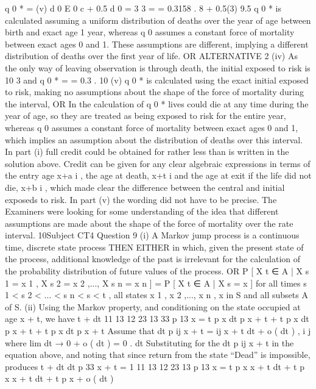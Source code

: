 \documentclass[a4paper,12pt]{article}
\begin{document}
\begin{enumerate}
q 0 * =
(v)
d 0
E 0 c
+ 0.5 d 0
=
3
3
=
= 0.3158 .
8 + 0.5(3) 9.5
q 0 * is calculated assuming a uniform distribution of deaths over the year of age
between birth and exact age 1 year, whereas q 0 assumes a constant force of mortality
between exact ages 0 and 1.
These assumptions are different, implying a different distribution of deaths over the
first year of life.
OR ALTERNATIVE 2
(iv) As the only way of leaving observation is through death, the initial exposed to risk is 10
3
and q 0 * =
= 0.3 .
10
(v) q 0 * is calculated using the exact initial exposed to risk, making no assumptions about
the shape of the force of mortality during the interval,
OR
In the calculation of q 0 * lives could die at any time during the year of age, so they are
treated as being exposed to risk for the entire year, whereas q 0 assumes a constant force
of mortality between exact ages 0 and 1, which implies an assumption about the
distribution of deaths over this interval.
In part (i) full credit could be obtained for rather less than is written in the solution above.
Credit can be given for any clear algebraic expressions in terms of the entry age x+a i , the
age at death, x+t i and the age at exit if the life did not die, x+b i , which made clear the
difference between the central and initial exposeds to risk.
In part (v) the wording did not have to be precise. The Examiners were looking for some
understanding of the idea that different assumptions are made about the shape of the force of
mortality over the rate interval.
10Subject CT4 %
Question 9
(i)
A Markov jump process is a continuous time, discrete state process
THEN EITHER
in which, given the present state of the process, additional knowledge of the past is
irrelevant for the calculation of the probability distribution of future values of the
process.
OR
P [ X t ∈ A | X s 1 = x 1 , X s 2 = x 2 ,..., X s n = x n ] = P [ X t ∈ A | X s = x ]
for all times s 1 < s 2 < ... < s n < s < t , all states x 1 , x 2 ,..., x n , x in S and all subsets A of S.
(ii)
Using the Markov property, and conditioning on the state occupied
at age x + t, we have
t + dt
11
13
12
23
13
33
p 13
x = t p x dt p x + t + t p x dt p x + t + t p x dt p x + t
Assume that
dt
p ij x + t = \mu ij x + t dt + o ( dt ) , i \neq j
where lim
dt → 0
+
o ( dt )
= 0 .
dt
Substituting for the dt p ij x + t in the equation above, and noting that
since return from the state “Dead” is impossible, produces
t + dt
dt
p 33
x + t = 1
11 13
12 23
13
p 13
x = t p x \mu x + t dt + t p x \mu x + t dt + t p x + o ( dt )

\end{enumerate}
\end{document}
